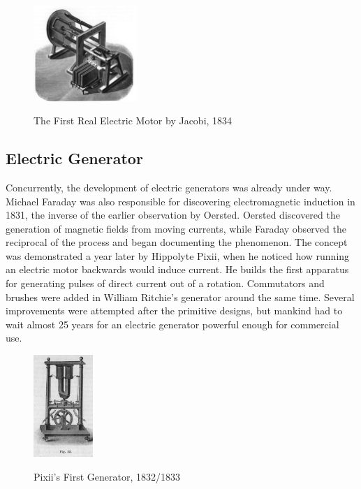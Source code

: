     \begin{figure}[ht]
        \begin{center}
            \includegraphics[width=0.35\textwidth]{figures/history/jacobi.jpg}
            \label{fig:jacobi}
        \end{center} \caption{The First Real Electric Motor by Jacobi, 1834}
    \end{figure}

    \subsection{Electric Generator}
    Concurrently, the development of electric generators was already under way. Michael Faraday was also responsible for discovering electromagnetic induction in 1831, the inverse of the earlier observation by Oersted. Oersted discovered the generation of magnetic fields from moving currents, while Faraday observed the reciprocal of the process and began documenting the phenomenon. The concept was demonstrated a year later by Hippolyte Pixii, when he noticed how running an electric motor backwards would induce current. He builds the first apparatus for generating pulses of direct current out of a rotation. \cite{needcite} Commutators and brushes were added in William Ritchie’s generator around the same time. Several improvements were attempted after the primitive designs, but mankind had to wait almost 25 years for an electric generator powerful enough for commercial use.\\

    \begin{figure}[ht]
        \begin{center}
            \includegraphics[width=0.2\textwidth]{figures/history/pixii.jpg}
            \label{fig:pixii} \caption{Pixii's First Generator, 1832/1833}
        \end{center}
    \end{figure}

